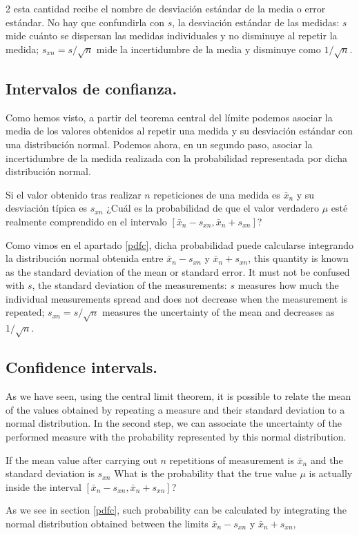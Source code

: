 \begin{paracol}{2}
esta cantidad recibe el nombre de desviación estándar de la media o error estándar. No hay que confundirla con $s$, la desviación estándar de las medidas: $s$ mide cuánto se dispersan las medidas individuales y no disminuye al repetir la medida; $s_{xn}=s/\sqrt{n}$ mide la incertidumbre de la media y disminuye como $1/\sqrt{n}$.

\subsection{Intervalos de confianza.}
Como hemos visto, a partir del teorema central del límite podemos asociar la media de los valores obtenidos al repetir una medida y su desviación estándar con una distribución normal. Podemos ahora, en un segundo paso, asociar la incertidumbre de la medida realizada con la probabilidad representada por dicha distribución normal.

Si el valor obtenido tras realizar $n$ repeticiones de una medida es $\bar{x}_n$ y su desviación típica es $s_{xn}$ ¿Cuál es la probabilidad de que el valor verdadero $\mu$ esté realmente comprendido en el intervalo $[\bar{x}_n-s_{xn}, \bar{x}_n+s_{xn}]$? 

Como vimos en el apartado \ref{pdfc}, dicha probabilidad puede calcularse integrando la distribución normal obtenida entre $\bar{x}_n-s_{xn}$ y $\bar{x}_n+s_{xn}$,
\switchcolumn
this quantity is known as the standard deviation of the mean or standard error. It must not be confused with $s$, the standard deviation of the measurements: $s$ measures how much the individual measurements spread and does not decrease when the measurement is repeated; $s_{xn}=s/\sqrt{n}$ measures the uncertainty of the mean and decreases as $1/\sqrt{n}$.

\subsection{Confidence intervals.}
As we have seen, using the central limit theorem, it is possible to relate the mean of the values obtained by repeating a measure and their standard deviation to a normal distribution. In the second step, we can associate the uncertainty of the performed measure with the probability represented by this normal distribution.

If the mean value after carrying out $n$ repetitions of measurement is $\bar{x}_n$ and the standard deviation is $s_{xn}$ What is the probability that the true value $\mu$ is actually inside the interval $[\bar{x}_n-s_{xn}, \bar{x}_n+s_{xn}]$? 

As we see in section \ref{pdfc}, such probability can be calculated by integrating the normal distribution obtained between the limits $\bar{x}_n-s_{xn}$ y $\bar{x}_n+s_{xn}$,
\end{paracol}

